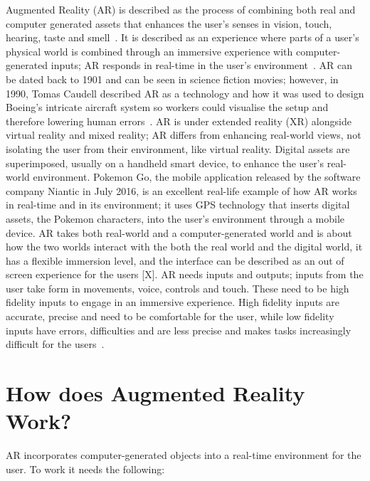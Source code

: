 Augmented Reality (AR) is described as the process of combining both real and computer generated assets that enhances the user's senses in vision, touch, hearing, taste and smell~\cite{Reference12}. It is described as an experience where parts of a user's physical world is combined through an immersive experience with computer-generated inputs; AR responds in real-time in the user's environment~\cite{Reference13}. AR can be dated back to 1901 and can be seen in science fiction movies; however, in 1990, Tomas Caudell described AR as a technology and how it was used to design Boeing's intricate aircraft system so workers could visualise the setup and therefore lowering human errors~\cite{Reference14}. 
 AR is under extended reality (XR) alongside virtual reality and mixed reality; AR differs from enhancing real-world views, not isolating the user from their environment, like virtual reality. Digital assets are superimposed, usually on a handheld smart device, to enhance the user's real-world environment. Pokemon Go, the mobile application released by the software company Niantic in July 2016, is an excellent real-life example of how AR works in real-time and in its environment; it uses GPS technology that inserts digital assets, the Pokemon characters, into the user's environment through a mobile device.
 AR takes both real-world and a computer-generated world and is about how the two worlds interact with the both the real world and the digital world, it has a flexible immersion level, and the interface can be described as an out of screen experience for the users [X]. AR needs inputs and outputs; inputs from the user take form in movements, voice, controls and touch. These need to be high fidelity inputs to engage in an immersive experience. High fidelity inputs are accurate, precise and need to be comfortable for the user, while low fidelity inputs have errors, difficulties and are less precise and makes tasks increasingly difficult for the users~\cite{Reference15}.
 
 \section{How does Augmented Reality Work?}

AR incorporates computer-generated objects into a real-time environment for the user. To work it needs the following: 

